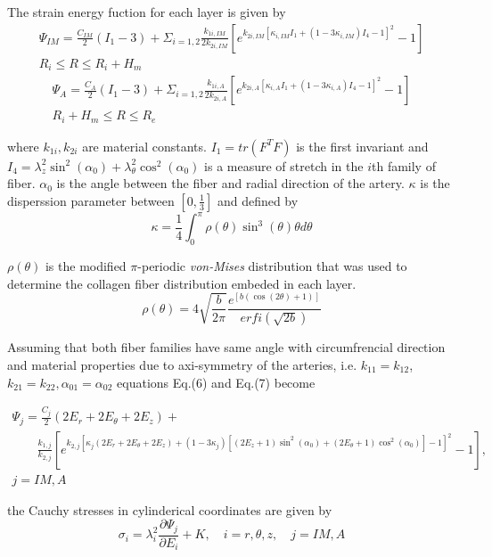 \documentclass[review]{elsarticle}
\begin{document}
The strain energy fuction for each layer is given by %
\begin{multline} 
    \Psi_{IM}=\frac{C_{IM}}{2}(I_1-3)+\Sigma_{i=1,2} \frac{k_{1i,IM}}{2k_{2i,IM}}[e^{k_{2i,IM}[\kappa_{i,IM}I_1+(1-3\kappa_{i,IM})I_4-1]^2}-1] \\
     R_i \leq R \leq R_i+H_m 
\end{multline}
\begin{multline}
    \Psi_{A}=\frac{C_A}{2}(I_1-3)+\Sigma_{i=1,2} \frac{k_{1i,A}}{2k_{2i,A}}[e^{k_{2i,A}[\kappa_{i,A}I_1+(1-3\kappa_{i,A})I_4-1]^2}-1]\\
     R_i+H_m \leq R \leq R_e
\end{multline}

where $k_{1i},k_{2i}$ are material constants. $I_1=tr(F^TF)$ is the first invariant and
$I_4=\lambda_z^2\sin^2(\alpha_0)+\lambda_{\theta}^2 \cos^2(\alpha_0)$ is a measure of stretch in the $i$th family of fiber. $\alpha_0$ is the
angle between the fiber and radial direction of the artery. $\kappa$ is the disperssion parameter between $[0,\frac{1}{3}]$ and defined by
\begin{equation}
    \kappa=\frac{1}{4}\int_0^{\pi} \rho(\theta) \sin^3(\theta)\theta d\theta
\end{equation}

$\rho(\theta)$ is the modified $\pi$-periodic \emph{von-Mises} distribution that was used to determine the collagen fiber distribution 
embeded in each layer.
\begin{equation}
    \rho(\theta)=4\sqrt{\frac{b}{2\pi}}\frac{e^{[b(\cos(2\theta)+1)]}}{erfi(\sqrt{2b})}
\end{equation}

Assuming that both fiber families have same angle with circumfrencial direction and material properties due to axi-symmetry of the arteries, i.e. $k_{11}=k_{12}$,$k_{21}=k_{22},\alpha_{01}=\alpha_{02}$
equations Eq.(6) and Eq.(7) become

\begin{multline}
    \Psi_{j}=\frac{C_j}{2}(2E_{r}+2E_{\theta}+2E_z)+ \\
   \qquad \frac{k_{1,j}}{k_{2,j}}[e^{k_{2,j}[\kappa_{j}(2E_{r}+2E_{\theta}+2E_z)+(1-3\kappa_{j})[(2E_z+1)\sin^2(\alpha_0)+(2E_{\theta}+1)\cos^2(\alpha_0)]-1]^2}-1], \\
    j=IM,A
\end{multline}

the Cauchy stresses in cylinderical coordinates are given by
\begin{equation}
    \sigma_i=\lambda_i^2 \frac{\partial \Psi_j}{\partial E_i}+ K, \quad
    i=r,\theta,z, \quad j=IM,A
\end{equation}
\end{document}

